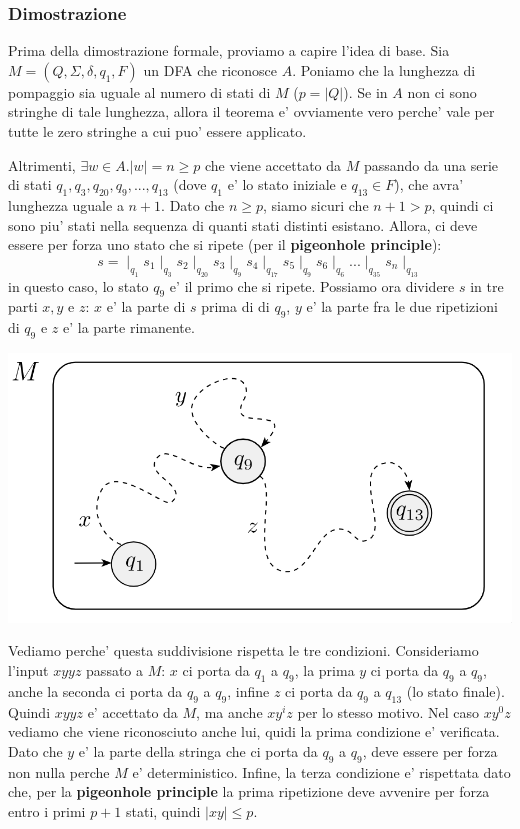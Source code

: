 \subsubsection{Dimostrazione}
Prima della dimostrazione formale, proviamo a capire l'idea di base. Sia $ M = (Q, \Sigma, \delta, q_1, F) $ un DFA che riconosce $ A $. Poniamo che la lunghezza di pompaggio sia uguale al numero di stati di $ M $ ($ p = |Q| $). Se in $ A $ non ci sono stringhe di tale lunghezza, allora il teorema e' ovviamente vero perche' vale per tutte le zero stringhe a cui puo' essere applicato.

Altrimenti, $ \exists w \in A. |w| = n \geq p $ che viene accettato da $ M $ passando da una serie di stati $ q_1, q_3, q_{20}, q_9, ..., q_{13} $ (dove $ q_1 $ e' lo stato iniziale e $ q_{13} \in F $), che avra' lunghezza uguale a $ n+1 $. Dato che $ n \geq p $, siamo sicuri che $ n+1 > p $, quindi ci sono piu' stati nella sequenza di quanti stati distinti esistano. Allora, ci deve essere per forza uno stato che si ripete (per il \textbf{pigeonhole principle}):
\[
s = \mid_{q_1} s_1  \mid_{q_3} s_2 \mid_{q_{20}} s_3 \mid_{q_9} s_4 \mid_{q_{17}} s_5 \mid_{q_9} s_6 \mid_{q_6} ... \mid_{q_{35}} s_n \mid_{q_{13}}
\]
in questo caso, lo stato $ q_9 $ e' il primo che si ripete. Possiamo ora dividere $ s $ in tre parti $ x, y $ e $ z $: $ x $ e' la parte di $ s $ prima di di $ q_9 $, $ y $ e' la parte fra le due ripetizioni di $ q_9 $ e $ z $ e' la parte rimanente. 

\begin{center}
  \includegraphics[scale=0.3]{img/2024-12-08-17-37-33.png}
\end{center}

Vediamo perche' questa suddivisione rispetta le tre condizioni. Consideriamo l'input $ xyyz $ passato a $ M $: $ x $ ci porta da $ q_1  $ a $ q_9 $, la prima $ y $ ci porta da $ q_9 $ a $ q_9 $, anche la seconda ci porta da $ q_9 $ a $ q_9 $, infine $ z $ ci porta da $ q_9 $ a $ q_{13} $ (lo stato finale). Quindi $ xyyz $ e' accettato da $ M $, ma anche $ xy^iz $ per lo stesso motivo. Nel caso $ xy^0z $ vediamo che viene riconosciuto anche lui, quidi la prima condizione e' verificata. Dato che $ y $ e' la parte della stringa che ci porta da $ q_9 $ a $ q_9 $, deve essere per forza non nulla perche $ M $ e' deterministico. Infine, la terza condizione e' rispettata dato che, per la \textbf{pigeonhole principle} la prima ripetizione deve avvenire per forza entro i primi $ p+1 $ stati, quindi $ |xy| \leq p $.

